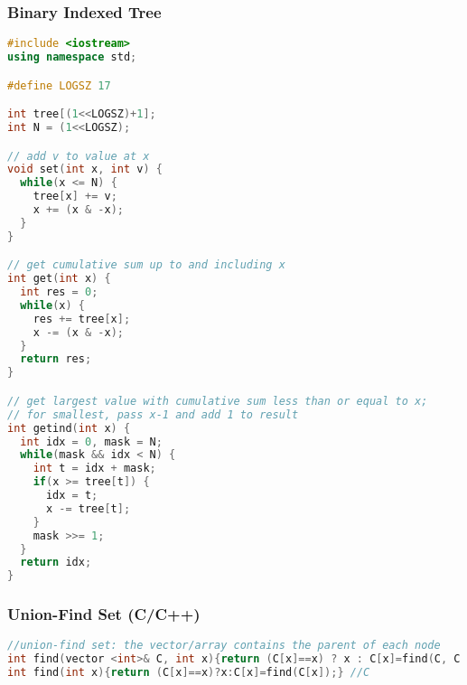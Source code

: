 \subsubsection{Binary Indexed Tree}
\begin{lstlisting}[language=C++]
#include <iostream>
using namespace std;

#define LOGSZ 17

int tree[(1<<LOGSZ)+1];
int N = (1<<LOGSZ);

// add v to value at x
void set(int x, int v) {
  while(x <= N) {
    tree[x] += v;
    x += (x & -x);
  }
}

// get cumulative sum up to and including x
int get(int x) {
  int res = 0;
  while(x) {
    res += tree[x];
    x -= (x & -x);
  }
  return res;
}

// get largest value with cumulative sum less than or equal to x;
// for smallest, pass x-1 and add 1 to result
int getind(int x) {
  int idx = 0, mask = N;
  while(mask && idx < N) {
    int t = idx + mask;
    if(x >= tree[t]) {
      idx = t;
      x -= tree[t];
    }
    mask >>= 1;
  }
  return idx;
}

\end{lstlisting}
\subsubsection{Union-Find Set (C/C++)}
\begin{lstlisting}[language=C++]
//union-find set: the vector/array contains the parent of each node
int find(vector <int>& C, int x){return (C[x]==x) ? x : C[x]=find(C, C[x]);} //C++
int find(int x){return (C[x]==x)?x:C[x]=find(C[x]);} //C

\end{lstlisting}

